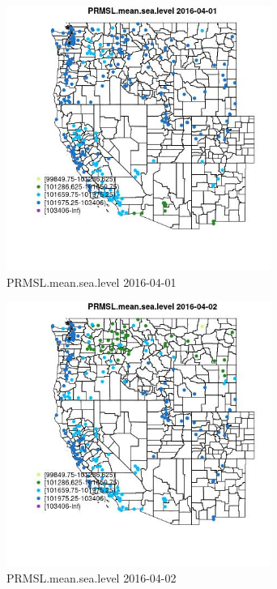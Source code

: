 \begin{figure} 
\centering  
\includegraphics[width=0.77\textwidth]{Code_Outputs/Report_ML_input_PM25_Step4_part_e_de_duplicated_aveswNAs_MapObsPRMSLmeansealevel2016-04-01.jpg} 
\caption{\label{fig:Report_ML_input_PM25_Step4_part_e_de_duplicated_aveswNAsMapObsPRMSLmeansealevel2016-04-01}PRMSL.mean.sea.level 2016-04-01} 
\end{figure} 
 

\begin{figure} 
\centering  
\includegraphics[width=0.77\textwidth]{Code_Outputs/Report_ML_input_PM25_Step4_part_e_de_duplicated_aveswNAs_MapObsPRMSLmeansealevel2016-04-02.jpg} 
\caption{\label{fig:Report_ML_input_PM25_Step4_part_e_de_duplicated_aveswNAsMapObsPRMSLmeansealevel2016-04-02}PRMSL.mean.sea.level 2016-04-02} 
\end{figure} 
 

